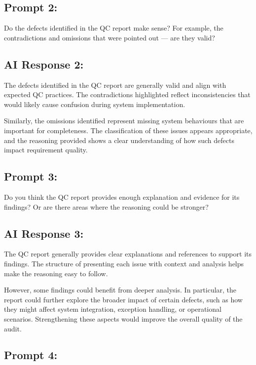 \documentclass[11pt,a4paper]{article}
\begin{document}
\subsection*{Prompt 2:}

Do the defects identified in the QC report make sense? For example, the contradictions and omissions that were pointed out — are they valid?

\subsection*{AI Response 2:}

The defects identified in the QC report are generally valid and align with expected QC practices. The contradictions highlighted reflect inconsistencies that would likely cause confusion during system implementation.

Similarly, the omissions identified represent missing system behaviours that are important for completeness. The classification of these issues appears appropriate, and the reasoning provided shows a clear understanding of how such defects impact requirement quality.

\subsection*{Prompt 3:}

Do you think the QC report provides enough explanation and evidence for its findings? Or are there areas where the reasoning could be stronger?

\subsection*{AI Response 3:}

The QC report generally provides clear explanations and references to support its findings. The structure of presenting each issue with context and analysis helps make the reasoning easy to follow.

However, some findings could benefit from deeper analysis. In particular, the report could further explore the broader impact of certain defects, such as how they might affect system integration, exception handling, or operational scenarios. Strengthening these aspects would improve the overall quality of the audit.

\subsection*{Prompt 4:}
\end{document}

